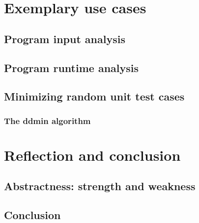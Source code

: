 \documentclass[a4paper,UKenglish]{lipics-v2018}
\begin{document}
\section{Exemplary use cases}
\subsection{Program input analysis}
\subsection{Program runtime analysis}
\subsection{Minimizing random unit test cases}
\subsubsection{The ddmin algorithm}

\section{Reflection and conclusion}
\subsection{Abstractness: strength and weakness}
\subsection{Conclusion}
\end{document}
